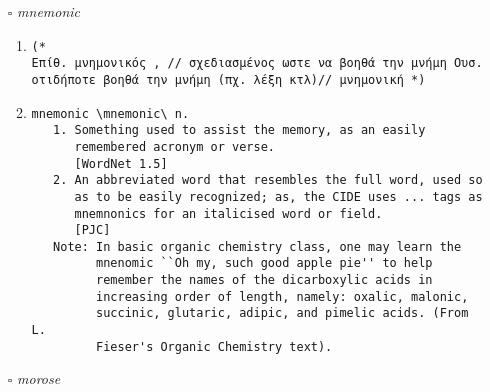 \documentclass{article}
\begin{document}
\begin{itemize}
\begin{enumerate}
{\begin{lstlisting}
(* 
Ουσ. ανακαλώ (κάτι που έχω πεί πριν), αναιρώ, παίρνω πίσω,// αποκηρύσσω *)
\end{lstlisting}}
\item{
\begin{lstlisting}
Recant \Re*cant"\, v. i.
   To revoke a declaration or proposition; to unsay what has
   been said; to retract; as, convince me that I am wrong, and I
   will recant. --Dryden.
   [1913 Webster]
Recant \Re*cant"\ (r[-e]*k[a^]nt"), v. t. [imp. & p. p.
   {Recanted}; p. pr. & vb. n. {Recanting}.] [L. recantare,
   recantatum, to recall, recant; pref. re- re- + cantare to
   sing, to sound. See 3d {Cant}, {Chant}.]
   To withdraw or repudiate formally and publicly (opinions
   formerly expressed); to contradict, as a former declaration;
   to take back openly; to retract; to recall.
   [1913 Webster]
         How soon . . . ease would recant
         Vows made in pain, as violent and void!  --Milton.
   [1913 Webster]
   Syn: To retract; recall; revoke; abjure; disown; disavow. See
        {Renounce}.
        [1913 Webster]
\end{lstlisting}}
\end{enumerate}
\item[$\square$] \emph{ mnemonic }
\begin{enumerate}
\item{
\begin{lstlisting}
(* 
Επίθ. μνημονικός , // σχεδιασμένος ωστε να βοηθά την μνήμη Ουσ. οτιδήποτε βοηθά την μνήμη (πχ. λέξη κτλ)// μνημονική *)
\end{lstlisting}}
\item{
\begin{lstlisting}
mnemonic \mnemonic\ n.
   1. Something used to assist the memory, as an easily
      remembered acronym or verse.
      [WordNet 1.5]
   2. An abbreviated word that resembles the full word, used so
      as to be easily recognized; as, the CIDE uses ... tags as
      mnemnonics for an italicised word or field.
      [PJC]
   Note: In basic organic chemistry class, one may learn the
         mnenomic ``Oh my, such good apple pie'' to help
         remember the names of the dicarboxylic acids in
         increasing order of length, namely: oxalic, malonic,
         succinic, glutaric, adipic, and pimelic acids. (From L.
         Fieser's Organic Chemistry text).
\end{lstlisting}}
\end{enumerate}
\item[$\square$] \emph{ morose }
\begin{enumerate}

\end{enumerate}
\end{itemize}
\end{document}
